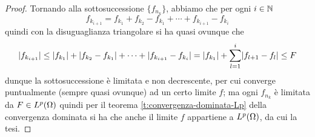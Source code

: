 \begin{proof}
    Tornando alla sottosuccessione $\{f_{n_k}\}$, abbiamo che per ogni $i\in\N$
    \begin{equation}
        f_{k_{i+1}}=f_{k_1}+f_{k_2}-f_{k_1}+\dotsb+f_{k_{i+1}}-f_{k_i}
    \end{equation}
    quindi con la disuguaglianza triangolare si ha quasi ovunque che
    \begin{equation}
        \abs{f_{k_{i+1}}} \le \abs{f_{k_1}}+\abs{f_{k_2}-f_{k_1}}+\dotsb+\abs{f_{k_{i+1}}-f_{k_i}} = \abs{f_{k_1}}+\sum_{l=1}^i\abs{f_{l+1}-f_l} \le F
    \end{equation}
    dunque la sottosuccessione è limitata e non decrescente, per cui converge puntualmente (sempre quasi ovunque) ad un certo limite $f$; ma ogni $f_{n_k}$ è limitata da $F\in\leb[p]{\Omega}$ quindi per il teorema \ref{t:convergenza-dominata-Lp} della convergenza dominata si ha che anche il limite $f$ appartiene a $\leb[p]{\Omega}$, da cui la tesi.
\end{proof}

